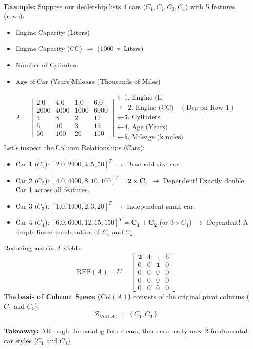 \documentclass[DIV=20,oneside]{scrartcl}
\newcommand{\takeaway}[1]{%
	\begin{tcolorbox}[
		colback=black!20,
		colframe=black,
		boxrule=0.5pt,
		arc=2mm]
		\textbf{Takeaway: } #1
	\end{tcolorbox}
}
\newcommand{\example}{
	\noindent\textbf{\\Example: }
}
\begin{document}
\example Suppose our dealership lists 4 cars ($C_1, C_2, C_3, C_4$) with 5 features (rows):
\begin{itemize}
	\item Engine Capacity (Liters)
	\item Engine Capacity (CC) $\rightarrow$ (1000 $\times$ Liters)
	\item Number of Cylinders
	\item Age of Car (Years)Mileage (Thousands of Miles)
\end{itemize}
$$A = \begin{bmatrix}  2.0 & 4.0 & 1.0 & 6.0 \\  2000 & 4000 & 1000 & 6000 \\  4 & 8 & 2 & 12 \\  5 & 10 & 3 & 15 \\  50 & 100 & 20 & 150  \end{bmatrix}  \begin{matrix}  \leftarrow \text{1. Engine (L)} \\  \leftarrow \text{2. Engine (CC)} \quad (\text{Dep on Row 1}) \\  \leftarrow \text{3. Cylinders} \\  \leftarrow \text{4. Age (Years)} \\  \leftarrow \text{5. Mileage (k miles)}  \end{matrix}$$
Let's inspect the Column Relationships (Cars):

\begin{itemize}
	\item Car 1 ($C_1$): $[2.0, 2000, 4, 5, 50]^T$ $\rightarrow$ Base mid-size car.
	\item Car 2 ($C_2$): $[4.0, 4000, 8, 10, 100]^T = \mathbf{2 \times C_1}$ $\rightarrow$ Dependent! Exactly double Car 1 across all features.
	\item Car 3 ($C_3$): $[1.0, 1000, 2, 3, 20]^T$ $\rightarrow$ Independent small car.
	\item Car 4 ($C_4$): $[6.0, 6000, 12, 15, 150]^T = \mathbf{C_1 + C_2}$ (or $3 \times C_1$) $\rightarrow$ Dependent! A simple linear combination of $C_1$ and $C_2$.
\end{itemize}
Reducing matrix $A$ yields:$$\text{REF}(A) = U = \begin{bmatrix}  \mathbf{2} & 4 & 1 & 6 \\  0 & 0 & \mathbf{1} & 0 \\  0 & 0 & 0 & 0 \\  0 & 0 & 0 & 0 \\  0 & 0 & 0 & 0  \end{bmatrix}$$
The \textbf{basis of Column Space ($\text{Col}(A)$)} consists of the original pivot columns ($C_1$ and $C_3$):$$\mathcal{B}_{\text{Col}(A)} = \left\{C_1,C_3 \right\}$$
\takeaway{Although the catalog lists 4 cars, there are really only 2 fundamental car styles ($C_1$ and $C_3$).}
\end{document}
